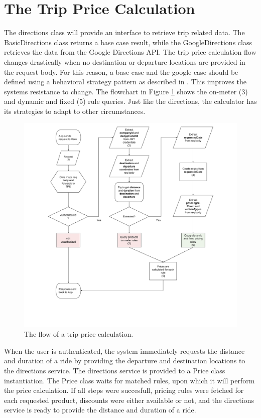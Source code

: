 \section{The Trip Price Calculation}
The directions class will provide an interface to retrieve trip related data. The BasicDirections class returns a base case result, while the GoogleDirections class retrieves the data from the Google Directions API. The trip price calculation flow changes drastically when no destination or departure locations are provided in the request body. For this reason, a base case and the google case should be defined using a behavioral strategy pattern as described in \cite{gof}. This improves the systems resistance to change. The flowchart in Figure \ref{fig:Calculation} shows the on-meter (3) and dynamic and fixed (5) rule queries. Just like the directions, the calculator has its strategies to adapt to other circumstances.

\begin{figure}[H]
	\centering
	\includegraphics[width=1\textwidth]{Calculation}
	\caption[Calculation Flow]{The flow of a trip price calculation.}
	\label{fig:Calculation}
\end{figure}

When the user is authenticated, the system immediately requests the distance and duration of a ride by providing the departure and destination locations to the directions service. The directions service is provided to a Price class instantiation. The Price class waits for matched rules, upon which it will perform the price calculation. If all steps were succesfull, pricing rules were fetched for each requested product, discounts were either available or not, and the directions service is ready to provide the distance and duration of a ride.

